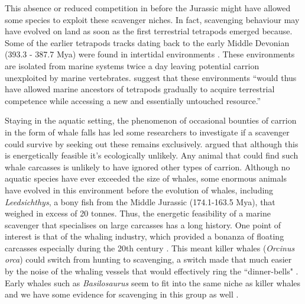\documentclass[a4paper,12pt]{article}
\begin{document}
This absence or reduced competition in before the Jurassic might have allowed some species to exploit these scavenger niches.
In fact, scavenging behaviour may have evolved on land as soon as the first terrestrial tetrapods emerged because.
Some of the earlier tetrapods tracks dating back to the early Middle Devonian (393.3 - 387.7 Mya) were found in intertidal environments \citep{Niedzwiedzki2009}.
These environments are isolated from marine systems twice a day leaving potential carrion unexploited by marine vertebrates.
\cite{Niedzwiedzki2009} suggest that these environments ``would thus have allowed marine ancestors of tetrapods gradually to acquire terrestrial competence while accessing a new and essentially untouched resource.''


Staying in the aquatic setting, the phenomenon of occasional bounties of carrion in the form of whale falls has led some researchers to investigate if a scavenger could survive by seeking out these remains exclusively.
\cite{ruxton2005searching} argued that although this is energetically feasible it's ecologically unlikely.
Any animal that could find such whale carcasses is unlikely to have ignored other types of carrion.
Although no aquatic species have ever exceeded the size of whales, some enormous animals have evolved in this environment before the evolution of whales, including \textit{Leedsichthys}, a bony fish from the Middle Jurassic (174.1-163.5 Mya), that weighed in excess of 20 tonnes.
Thus, the energetic feasibility of a marine scavenger that specialises on large carcasses has a long history.
One point of interest is that of the whaling industry, which provided a bonanza of floating carcasses especially during the 20th century \citep{Whitehead415}.
This meant killer whales (\textit{Orcinus orca}) could switch from hunting to scavenging, a switch made that much easier by the noise of the whaling vessels that would effectively ring the ``dinner-bells" \citep{Whitehead415}.
Early whales such as \textit{Basilosaurus} seem to fit into the same niche as killer whales and we have some evidence for scavenging in this group as well \citep{fahlke2012bite}.
\end{document}
